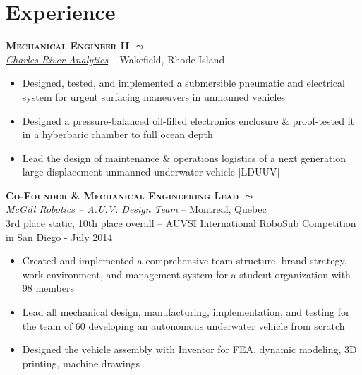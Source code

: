 \documentclass[11pt, letterpaper]{article}
\newcommand{\years}[1]{\marginnote{\footnotesize #1}} %
\begin{document}
  \section*{Experience}

  \begin{samepage}
    \years{9/2014 - Present} \textbf{\scshape Mechanical Engineer II \href{http://www.michaelelliotking.com/blog/first-job/}{$\leadsto$}}\\
    \href {http://www.cra.com}{\textit{Charles River Analytics}} -- Wakefield, Rhode Island
    \begin{itemize}
      \item Designed, tested, and implemented a submersible pneumatic and electrical system for urgent surfacing maneuvers in unmanned vehicles
      \item Designed a pressure-balanced oil-filled electronics enclosure \& proof-tested it in a hyberbaric chamber to full ocean depth
      \item Lead the design of maintenance \& operations logistics of a next generation large displacement unmanned underwater vehicle [LDUUV]
    \end{itemize}
  \end{samepage}

  \begin{samepage}
    \years{8/2013 - 8/2014} \textbf{\scshape Co-Founder \& Mechanical Engineering Lead \href{http://www.michaelelliotking.com/projects/mcgillrobotics}{$\leadsto$}}\\
    \href {http://www.mcgillrobotics.com}{\textit{McGill Robotics -- A.U.V. Design Team}} -- Montreal, Quebec\\
    {\small 3rd place static, 10th place overall -- AUVSI International RoboSub Competition in San Diego - July 2014}
    \begin{itemize}
      \item Created and implemented a comprehensive team structure, brand strategy, work environment, and management system for a student organization with 98 members
      \item Lead all mechanical design, manufacturing, implementation, and testing for the team of 60 developing an autonomous underwater vehicle from scratch
      \item Designed the vehicle assembly with Inventor for FEA, dynamic modeling, 3D printing, machine drawings 
    \end{itemize}
  \end{samepage}
\end{document}

